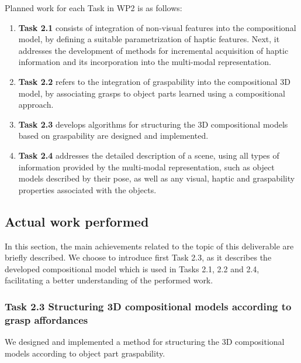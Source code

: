 \documentclass[a4paper,11pt,pdf]{pacmanreport}
\begin{document}
Planned work for each Task in WP2 is as follows:
\begin{enumerate}

\item[] \textbf{Task 2.1} consists of integration of 
non-visual features into the compositional model, by defining a suitable 
parametrization of haptic features. Next, it addresses the development of 
methods for incremental acquisition of haptic information and its incorporation 
into the multi-modal representation. 

\item[] \textbf{Task 2.2} refers to the integration of graspability into the 
compositional 3D model, by associating grasps to object parts learned using a 
compositional approach.

\item[] \textbf{Task 2.3} develops algorithms for structuring the 3D 
compositional models based on graspability are designed and implemented.

\item[] \textbf{Task 2.4} addresses the detailed description of a scene, using 
all types of information provided by the multi-modal representation, such as 
object models described by their pose, as well as any visual, haptic and 
graspability properties associated with the objects.

\end{enumerate}

\subsection{Actual work performed}

In this section, the main achievements related to the topic of this deliverable are briefly described.
We choose to introduce first Task 2.3, as it describes the developed compositional model which is used in Tasks 2.1, 2.2 and 2.4, facilitating a 
better understanding of the performed work.


\subsubsection{Task 2.3 Structuring 3D compositional models according to grasp affordances}

We designed and implemented a method for structuring the 3D compositional models according to object part graspability.
\end{document}

